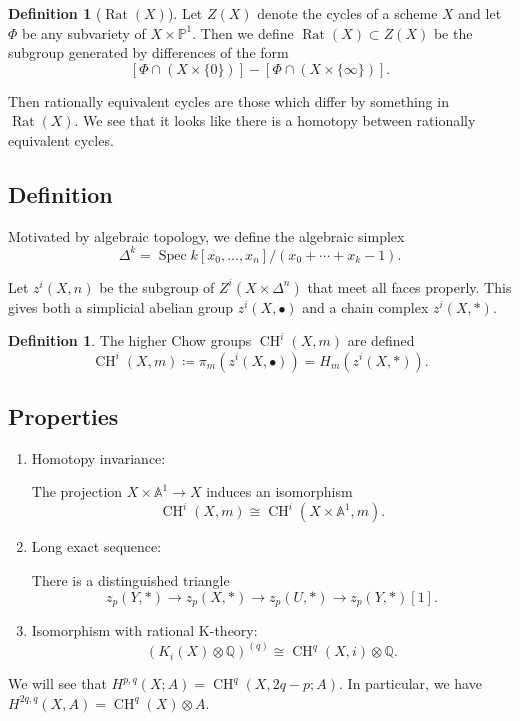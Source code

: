 \documentclass[leqno, openany]{memoir}
\theoremstyle{definition}
\newtheorem{defn}[thm]{Definition}
\theoremstyle{remark}
\theoremstyle{plain}
\theoremstyle{definition}
\theoremstyle{remark}
\newcommand{\A}{\mathbb{A}}
\newcommand{\Q}{\mathbb{Q}}
\renewcommand{\P}{\mathbb{P}}
\DeclareMathOperator{\Spec}{Spec}
\DeclareMathOperator{\CH}{CH}
\DeclareMathOperator{\Rat}{Rat}
\begin{document}
\begin{defn}
[$\Rat(X)$]
Let $Z(X)$ denote the cycles of a scheme $X$ and let $\Phi$ be any subvariety of $X\times \P^1$.  Then we define $\Rat(X)\subset Z(X)$ be the subgroup generated by differences of the form 
\[
[\Phi\cap (X\times \{0\})] - [\Phi\cap (X\times \{\infty\})].
\]
\end{defn}
Then rationally equivalent cycles are those which differ by something in $\Rat(X)$.  We see that it looks like there is a homotopy between rationally equivalent cycles. \\  

\subsection{Definition}

Motivated by algebraic topology, we define the algebraic simplex 
\[
\Delta^k = \Spec k[x_0, \ldots, x_n]/(x_0+\cdots +x_k-1).
\] 

Let $z^i(X, n)$ be the subgroup of $Z^i(X\times \Delta^n)$ that meet all faces properly.   This gives both a simplicial abelian group $z^i(X, \bullet)$ and a chain complex $z^i(X, *)$.  

\begin{defn}
The higher Chow groups $\CH^i(X, m)$ are defined 
\[
\CH^i(X, m)\coloneqq\pi_m(z^i(X, \bullet))=H_m(z^i(X, *)).
\] 
\end{defn}


\subsection{Properties}

\begin{enumerate}
\item Homotopy invariance: 

The projection $X\times \A^1\rightarrow X$ induces an isomorphism 
\[
\CH^i(X, m)\cong \CH^i(X\times \A^1, m).
\] 

\item Long exact sequence: 

There is a distinguished triangle 
\[
z_p(Y, *)\rightarrow z_p(X, *)\rightarrow z_p(U, *)\rightarrow z_p(Y, *)[1].
\]

\item Isomorphism with rational K-theory: 
\[
(K_i(X)\otimes \Q)^{(q)}\cong \CH^q(X, i)\otimes \Q.
\]
\end{enumerate}

We will see that $H^{p, q}(X; A)=\CH^q(X, 2q-p; A)$.  In particular, we have $H^{2q, q}(X, A)=\CH^q(X)\otimes A$. 
\end{document}

